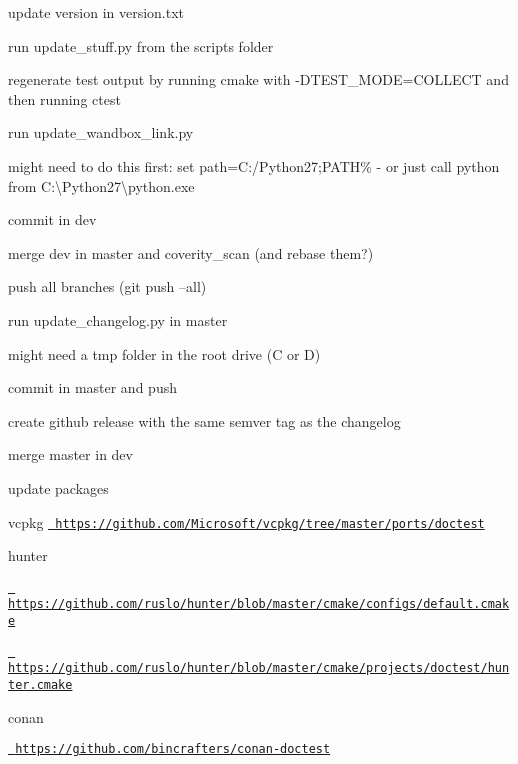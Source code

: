 
\begin{DoxyItemize}
\item update version in version.\+txt
\item run update\+\_\+stuff.\+py from the scripts folder
\item regenerate test output by running cmake with -\/D\+T\+E\+S\+T\+\_\+\+M\+O\+DE=C\+O\+L\+L\+E\+CT and then running ctest
\item run update\+\_\+wandbox\+\_\+link.\+py
\begin{DoxyItemize}
\item might need to do this first\+: set path=C\+:/\+Python27;P\+A\+TH\% -\/ or just call python from C\+:\textbackslash{}\+Python27\textbackslash{}python.exe
\end{DoxyItemize}
\item commit in dev
\item merge dev in master and coverity\+\_\+scan (and rebase them?)
\item push all branches (git push --all)
\item run update\+\_\+changelog.\+py in master
\begin{DoxyItemize}
\item might need a tmp folder in the root drive (C or D)
\end{DoxyItemize}
\item commit in master and push
\item create github release with the same semver tag as the changelog
\item merge master in dev
\item update packages
\begin{DoxyItemize}
\item vcpkg \href{https://github.com/Microsoft/vcpkg/tree/master/ports/doctest}{\texttt{ https\+://github.\+com/\+Microsoft/vcpkg/tree/master/ports/doctest}}
\item hunter
\begin{DoxyItemize}
\item \href{https://github.com/ruslo/hunter/blob/master/cmake/configs/default.cmake}{\texttt{ https\+://github.\+com/ruslo/hunter/blob/master/cmake/configs/default.\+cmake}}
\item \href{https://github.com/ruslo/hunter/blob/master/cmake/projects/doctest/hunter.cmake}{\texttt{ https\+://github.\+com/ruslo/hunter/blob/master/cmake/projects/doctest/hunter.\+cmake}}
\end{DoxyItemize}
\item conan
\begin{DoxyItemize}
\item \href{https://github.com/bincrafters/conan-doctest}{\texttt{ https\+://github.\+com/bincrafters/conan-\/doctest}} 
\end{DoxyItemize}
\end{DoxyItemize}
\end{DoxyItemize}